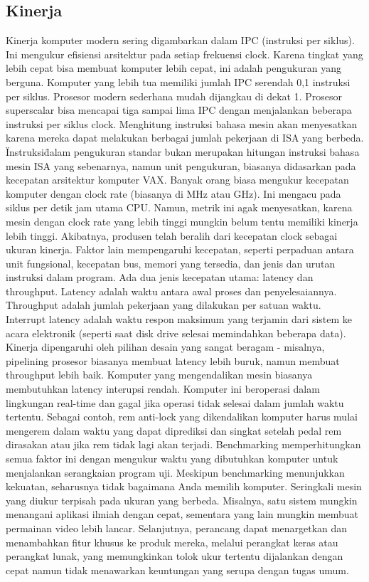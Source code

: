 {\subsection{Kinerja}
Kinerja komputer modern sering digambarkan dalam IPC (instruksi per siklus). Ini mengukur efisiensi arsitektur pada setiap frekuensi clock. Karena tingkat yang lebih cepat bisa membuat komputer lebih cepat, ini adalah pengukuran yang berguna. Komputer yang lebih tua memiliki jumlah IPC serendah 0,1 instruksi per siklus. Prosesor modern sederhana mudah dijangkau di dekat 1. Prosesor superscalar bisa mencapai tiga sampai lima IPC dengan menjalankan beberapa instruksi per siklus clock.
Menghitung instruksi bahasa mesin akan menyesatkan karena mereka dapat melakukan berbagai jumlah pekerjaan di ISA yang berbeda. \"Instruksi\" dalam pengukuran standar bukan merupakan hitungan instruksi bahasa mesin ISA yang sebenarnya, namun unit pengukuran, biasanya didasarkan pada kecepatan arsitektur komputer VAX.
Banyak orang biasa mengukur kecepatan komputer dengan clock rate (biasanya di MHz atau GHz). Ini mengacu pada siklus per detik jam utama CPU. Namun, metrik ini agak menyesatkan, karena mesin dengan clock rate yang lebih tinggi mungkin belum tentu memiliki kinerja lebih tinggi. Akibatnya, produsen telah beralih dari kecepatan clock sebagai ukuran kinerja.
Faktor lain mempengaruhi kecepatan, seperti perpaduan antara unit fungsional, kecepatan bus, memori yang tersedia, dan jenis dan urutan instruksi dalam program.
Ada dua jenis kecepatan utama: latency dan throughput. Latency adalah waktu antara awal proses dan penyelesaiannya. Throughput adalah jumlah pekerjaan yang dilakukan per satuan waktu. Interrupt latency adalah waktu respon maksimum yang terjamin dari sistem ke acara elektronik (seperti saat disk drive selesai memindahkan beberapa data).
Kinerja dipengaruhi oleh pilihan desain yang sangat beragam - misalnya, pipelining prosesor biasanya membuat latency lebih buruk, namun membuat throughput lebih baik. Komputer yang mengendalikan mesin biasanya membutuhkan latency interupsi rendah. Komputer ini beroperasi dalam lingkungan real-time dan gagal jika operasi tidak selesai dalam jumlah waktu tertentu. Sebagai contoh, rem anti-lock yang dikendalikan komputer harus mulai mengerem dalam waktu yang dapat diprediksi dan singkat setelah pedal rem dirasakan atau jika rem tidak lagi akan terjadi.
Benchmarking memperhitungkan semua faktor ini dengan mengukur waktu yang dibutuhkan komputer untuk menjalankan serangkaian program uji. Meskipun benchmarking menunjukkan kekuatan, seharusnya tidak bagaimana Anda memilih komputer. Seringkali mesin yang diukur terpisah pada ukuran yang berbeda. Misalnya, satu sistem mungkin menangani aplikasi ilmiah dengan cepat, sementara yang lain mungkin membuat permainan video lebih lancar. Selanjutnya, perancang dapat menargetkan dan menambahkan fitur khusus ke produk mereka, melalui perangkat keras atau perangkat lunak, yang memungkinkan tolok ukur tertentu dijalankan dengan cepat namun tidak menawarkan keuntungan yang serupa dengan tugas umum.

}
